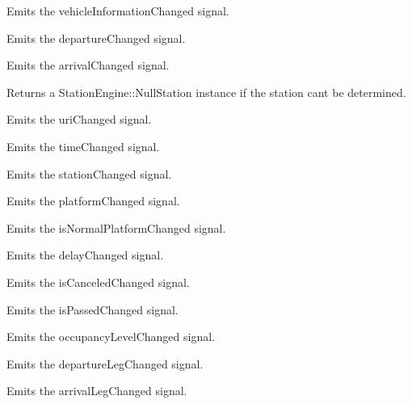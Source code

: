 Emits the vehicle\+Information\+Changed signal.

Emits the departure\+Changed signal.

Emits the arrival\+Changed signal.

Returns a Station\+Engine\+::\+Null\+Station instance if the station can\textquotesingle{}t be determined.

Emits the uri\+Changed signal.

Emits the time\+Changed signal.

Emits the station\+Changed signal.

Emits the platform\+Changed signal.

Emits the is\+Normal\+Platform\+Changed signal.

Emits the delay\+Changed signal.

Emits the is\+Canceled\+Changed signal.

Emits the is\+Passed\+Changed signal.

Emits the occupancy\+Level\+Changed signal.

Emits the departure\+Leg\+Changed signal.

Emits the arrival\+Leg\+Changed signal. 